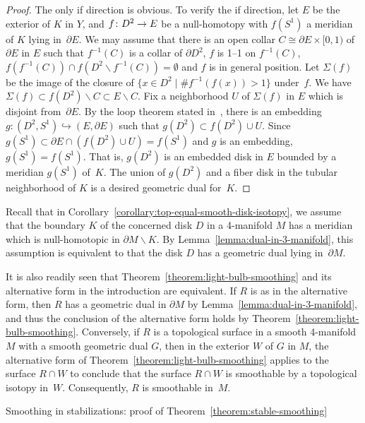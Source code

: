 \documentclass[11pt]{amsart}
\makeatletter
\def\section{\@startsection{section}{1}%
  \z@{-1.4\linespacing\@plus-.5\linespacing}{.8\linespacing}%
  {\normalfont\bfseries\Large\raggedright}}
\def\to{\mathchoice{\longrightarrow}{\rightarrow}{\rightarrow}{\rightarrow}}
\theoremstyle{definition}
\theoremstyle{theorem-giventitle}
\theoremstyle{definition-giventitle}
\numberwithin{equation}{section}
\def\setminus{\smallsetminus}
\makeatother
\begin{document}
\begin{proof}
  The only if direction is obvious.
  To verify the if direction, let $E$ be the exterior of $K$ in $Y$, and $f\colon D^2\to E$ be a null-homotopy with $f(S^1)$ a meridian of $K$ lying in~$\partial E$.
  We may assume that there is an open collar $C\cong \partial E\times [0,1)$ of $\partial E$ in $E$ such that $f^{-1}(C)$ is a collar of $\partial D^2$, $f$ is 1--1 on $f^{-1}(C)$, $f(f^{-1}(C))\cap f(D^2\setminus f^{-1}(C))=\emptyset$ and $f$ is in general position.
  Let $\Sigma(f)$ be the image of the closure of $\{x\in D^2\mid \# f^{-1}(f(x)) > 1\}$ under~$f$.
  We have $\Sigma(f)\subset f(D^2)\setminus C \subset E\setminus C$.
  Fix a neighborhood $U$ of $\Sigma(f)$ in $E$ which is disjoint from~$\partial E$.
  By the loop theorem stated in~\cite[Theorem~4.10]{Hempel:1976-1}, there is an embedding $g\colon (D^2,S^1) \hookrightarrow (E, \partial E)$ such that $g(D^2) \subset f(D^2)\cup U$.
  Since $g(S^1) \subset \partial E \cap (f(D^2)\cup U) = f(S^1)$ and $g$ is an embedding, $g(S^1)=f(S^1)$.
  That is, $g(D^2)$ is an embedded disk in $E$ bounded by a meridian $g(S^1)$ of~$K$.
  The union of $g(D^2)$ and a fiber disk in the tubular neighborhood of $K$ is a desired geometric dual for~$K$.
\end{proof}

Recall that in Corollary~\ref{corollary:top-equal-smooth-disk-isotopy}, we assume that the boundary $K$ of the concerned disk $D$ in a 4-manifold $M$ has a meridian which is null-homotopic in $\partial M\setminus K$.
By Lemma~\ref{lemma:dual-in-3-manifold}, this assumption is equivalent to that the disk $D$ has a geometric dual lying in~$\partial M$.

It is also readily seen that Theorem~\ref{theorem:light-bulb-smoothing} and its alternative form in the introduction are equivalent.
If $R$ is as in the alternative form, then $R$ has a geometric dual in $\partial M$ by Lemma~\ref{lemma:dual-in-3-manifold}, and thus the conclusion of the alternative form holds by Theorem~\ref{theorem:light-bulb-smoothing}\@.
Conversely, if $R$ is a topological surface in a smooth 4-manifold $M$ with a smooth geometric dual $G$, then in the exterior $W$ of $G$ in $M$, the alternative form of Theorem~\ref{theorem:light-bulb-smoothing} applies to the surface $R\cap W$ to conclude that the surface $R\cap W$ is smoothable by a topological isotopy in~$W$.  Consequently, $R$ is smoothable in~$M$.



\section{Smoothing in stabilizations: proof of Theorem~\ref{theorem:stable-smoothing}}
\label{section:proof-stable-smoothing}
\end{document}
